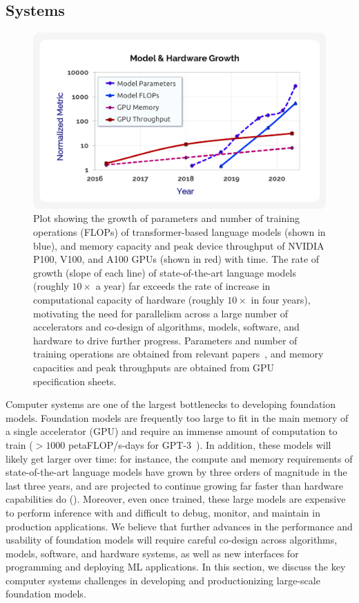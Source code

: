 \newsection
\subsection{Systems}
\label{sec:systems}

\begin{figure}[!ht]
\centering
\includegraphics[width=0.7\linewidth]{technology/figures/Systems.png}
\caption{\label{fig:systems} Plot showing the growth of parameters and number of training operations (FLOPs) of transformer-based language models (shown in blue), and memory capacity and peak device throughput of NVIDIA P100, V100, and A100 GPUs (shown in red) with time. The rate of growth (slope of each line) of state-of-the-art language models (roughly $10\times$ a year) far exceeds the rate of increase in computational capacity of hardware (roughly $10\times$ in four years), motivating the need for parallelism across a large number of accelerators and co-design of algorithms, models, software, and hardware to drive further progress. Parameters and number of training operations are obtained from relevant papers~\citep{brown2020gpt3}, and memory capacities and peak throughputs are obtained from GPU specification sheets.}
\end{figure}

Computer systems are one of the largest bottlenecks to developing foundation models. Foundation models are frequently too large to fit in the main memory of a single accelerator (\eg GPU) and require an immense amount of computation to train (\eg $>1000$ petaFLOP/s-days for GPT-3~\citep{brown2020gpt3}). In addition, these models will likely get larger over time: for instance, the compute and memory requirements of state-of-the-art language models have grown by three orders of magnitude in the last three years, and are projected to continue growing far faster than hardware capabilities do (). Moreover, even once trained, these large models are expensive to perform inference with and difficult to debug, monitor, and maintain in production applications. We believe that further advances in the performance and usability of foundation models will require careful co-design across algorithms, models, software, and hardware systems, as well as new interfaces for programming and deploying ML applications. In this section, we discuss the key computer systems challenges in developing and productionizing large-scale foundation models.

